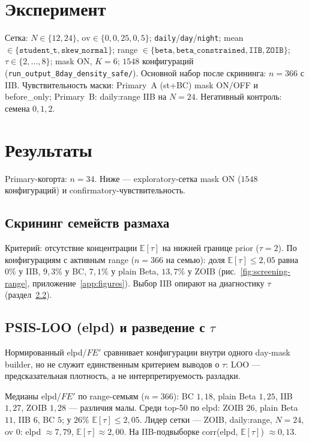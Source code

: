 \documentclass{article}
\begin{document}
\section{Эксперимент}

Сетка: \(N\in\{12,24\}\), \(\mathrm{ov}\in\{0,0{,}25,0{,}5\}\); \texttt{daily}/\texttt{day}/\texttt{night}; mean \(\in\{\mathtt{student\_t},\mathtt{skew\_normal}\}\); range \(\in\{\mathtt{beta},\mathtt{beta\_constrained},\mathtt{IIB},\mathtt{ZOIB}\}\); \(\tau\in\{2,\ldots,8\}\); mask ON, \(K=6\); \(1548\) конфигураций (\texttt{run\_output\_8day\_density\_safe/}). Основной набор после скрининга: \(n=366\) с IIB. Чувствительность маски: Primary~A (st+BC) mask ON/OFF и before\_only; Primary~B: daily:range IIB на \(N=24\). Негативный контроль: семена \(0,1,2\).


\section{Результаты}

Primary-когорта: \(n=34\). Ниже --- exploratory-сетка mask ON (\(1548\) конфигураций) и confirmatory-чувствительность.

\subsection{Скрининг семейств размаха}

Критерий: отсутствие концентрации \(\mathbb{E}[\tau]\) на нижней границе prior (\(\tau=2\)). По конфигурациям с активным range (\(n=366\) на семью): доля \(\mathbb{E}[\tau]\le 2{,}05\) равна \(0\%\) у IIB, \(9{,}3\%\) у BC, \(7{,}1\%\) у plain Beta, \(13{,}7\%\) у ZOIB (рис.~\ref{fig:screening-range}, приложение~\ref{app:figures}). Выбор IIB опирают на диагностику \(\tau\) (раздел~\ref{sec:elpd}).

\subsection{PSIS-LOO (elpd) и разведение с \texorpdfstring{$\tau$}{tau}}
\label{sec:elpd}

Нормированный elpd/\(F E'\) сравнивает конфигурации внутри одного day-mask builder, но не служит единственным критерием выводов о \(\tau\): LOO --- предсказательная плотность, а не интерпретируемость разладки.

Медианы elpd/\(F E'\) по range-семьям (\(n=366\)): BC \(1{,}18\), plain Beta \(1{,}25\), IIB \(1{,}27\), ZOIB \(1{,}28\) --- различия малы. Среди top-50 по elpd: ZOIB \(26\), plain Beta \(11\), IIB \(6\), BC \(5\); у \(26\%\) \(\mathbb{E}[\tau]\le 2{,}05\). Лидер сетки --- ZOIB, daily:range, \(N=24\), ov \(0\): elpd \(\approx 7{,}79\), \(\mathbb{E}[\tau]\approx 2{,}00\). На IIB-подвыборке corr(elpd, \(\mathbb{E}[\tau]\)) \(\approx 0{,}13\).
\end{document}
